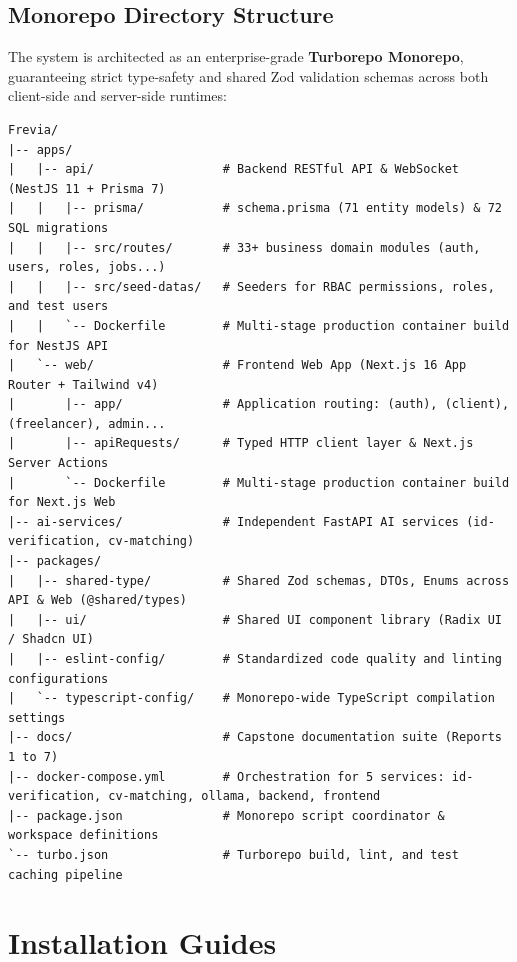 \subsection*{Monorepo Directory Structure}

The system is architected as an enterprise-grade \textbf{Turborepo Monorepo}, guaranteeing strict type-safety and shared Zod validation schemas across both client-side and server-side runtimes:

\begin{lstlisting}[frame=single,basicstyle=\scriptsize\ttfamily,backgroundcolor=\color{codebg}]
Frevia/
|-- apps/
|   |-- api/                  # Backend RESTful API & WebSocket (NestJS 11 + Prisma 7)
|   |   |-- prisma/           # schema.prisma (71 entity models) & 72 SQL migrations
|   |   |-- src/routes/       # 33+ business domain modules (auth, users, roles, jobs...)
|   |   |-- src/seed-datas/   # Seeders for RBAC permissions, roles, and test users
|   |   `-- Dockerfile        # Multi-stage production container build for NestJS API
|   `-- web/                  # Frontend Web App (Next.js 16 App Router + Tailwind v4)
|       |-- app/              # Application routing: (auth), (client), (freelancer), admin...
|       |-- apiRequests/      # Typed HTTP client layer & Next.js Server Actions
|       `-- Dockerfile        # Multi-stage production container build for Next.js Web
|-- ai-services/              # Independent FastAPI AI services (id-verification, cv-matching)
|-- packages/
|   |-- shared-type/          # Shared Zod schemas, DTOs, Enums across API & Web (@shared/types)
|   |-- ui/                   # Shared UI component library (Radix UI / Shadcn UI)
|   |-- eslint-config/        # Standardized code quality and linting configurations
|   `-- typescript-config/    # Monorepo-wide TypeScript compilation settings
|-- docs/                     # Capstone documentation suite (Reports 1 to 7)
|-- docker-compose.yml        # Orchestration for 5 services: id-verification, cv-matching, ollama, backend, frontend
|-- package.json              # Monorepo script coordinator & workspace definitions
`-- turbo.json                # Turborepo build, lint, and test caching pipeline
\end{lstlisting}

\section{Installation Guides}

